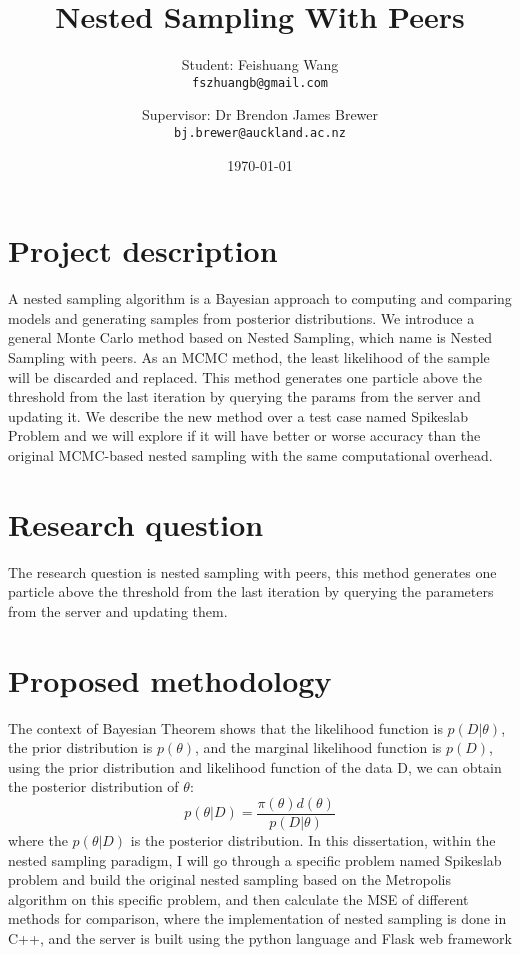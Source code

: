 \documentclass{article}
\title{Nested Sampling With Peers}
\author{
  Student: Feishuang Wang\\
  \texttt{fszhuangb@gmail.com}
  \and
  Supervisor: Dr Brendon James Brewer\\
  \texttt{bj.brewer@auckland.ac.nz}
}
\date{\today}
\begin{document}
\maketitle

\section{Project description}
A nested sampling algorithm is a Bayesian approach to computing and comparing models and generating samples from posterior distributions. We introduce a general Monte Carlo method based on Nested Sampling, which name is Nested Sampling with peers. As an MCMC method, the least likelihood of the sample will be discarded and replaced. This method generates one particle above the threshold from the last iteration by querying the params from the server and updating it. We describe the new method over a test case named Spikeslab Problem and we will explore if it will have better or worse accuracy than the original MCMC-based nested sampling with the same computational overhead.
\section{Research question}
The research question is nested sampling with peers,  this method generates one particle above the threshold from the last iteration by querying the parameters from the server and updating them. 
\section{Proposed methodology}
The context of Bayesian Theorem shows that the likelihood function is $p(D|\theta)$, the prior distribution is 
$p(\theta)$, and the marginal likelihood function is $p(D)$, using the prior distribution and
likelihood function of the data D, we can obtain the posterior distribution of $\theta$:
\begin{equation}
    p(\theta|D) = \frac{\pi(\theta)d(\theta)}{p(D|\theta)}
\end{equation}
where the $p(\theta|D)$ is the posterior distribution.
In this dissertation, within the nested sampling paradigm, 
I will go through a specific problem named Spikeslab problem and build the original nested sampling based on the Metropolis algorithm on this specific problem,
and then calculate the MSE of different methods for comparison, where the implementation of nested sampling is done in C++, 
and the server is built using the python language and Flask web framework
\end{document}
